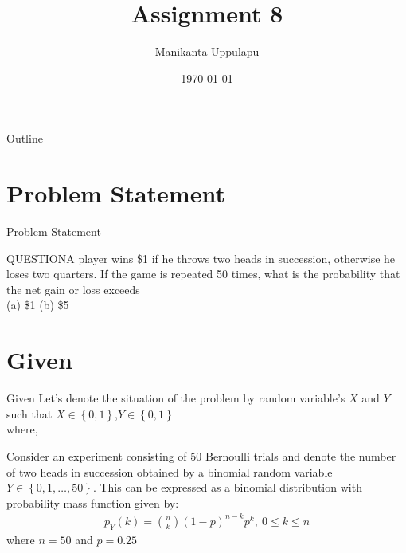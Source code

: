 \documentclass{beamer}
\title{Assignment 8}
\author{Manikanta Uppulapu}
\date{\today}
\providecommand{\cbrak}[1]{\ensuremath{\left\{#1\right\}}}
\providecommand{\cbrak}[1]{\ensuremath{\left\{#1\right\}}}
\begin{document}
\begin{frame}
    \titlepage 
\end{frame}

\logo{}


\begin{frame}{Outline}
    \tableofcontents
\end{frame}



\section{Problem Statement}
\begin{frame}{Problem Statement}
    \begin{block} {QUESTION}A player wins \$1 if he throws two heads in succession, otherwise he loses two quarters.
If the game is repeated 50 times, what is the probability that the net gain or loss exceeds\\
(a) \$1 (b) \$5
    \end{block}
\end{frame}



\section{Given}
\begin{frame}{Given}
Let's denote the situation of the problem by random variable's $X$ and $Y$  such that $X\in \cbrak{0,1}$,$Y\in \cbrak{0,1}$\\
where,\\
\begin{table}[ht!]
    \centering
    
    \caption{}
\label{table:table1}
\end{table}

\end{frame}

\begin{frame}
	Consider an experiment consisting of $50$ Bernoulli trials and denote the number of two heads in succession obtained by a binomial random variable $Y \in \cbrak{0,1,\ldots,50}$. This can be expressed as a binomial distribution with probability mass function given by:
	\begin{align}
		p_Y(k) = \binom{n}{k} (1-p)^{n-k} p^k,~ 0 \le k \le n
	\end{align}
	where $n = 50$ and $p = 0.25$
	\end{frame}
	
\end{document}
